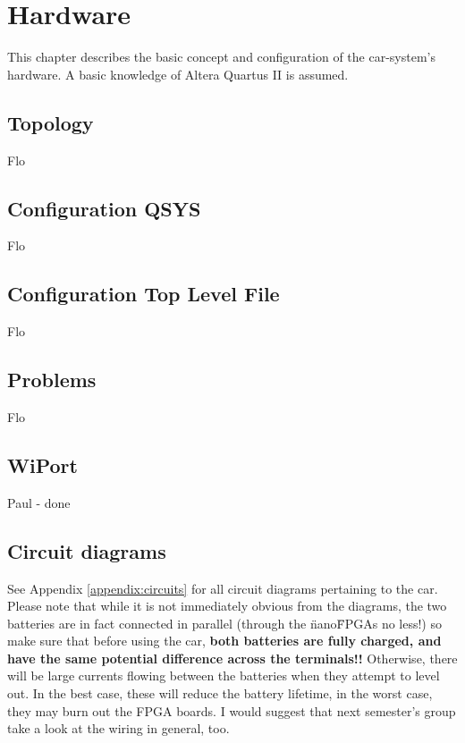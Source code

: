 \chapter{Hardware}
This chapter describes the basic concept and configuration of the car-system's hardware. A basic knowledge of Altera Quartus II is assumed.
\section{Topology}
Flo

\section{Configuration QSYS}
Flo

\section{Configuration Top Level File}
Flo

\section{Problems}
Flo

\section{WiPort}
Paul - done

\section{Circuit diagrams}
See Appendix \ref{appendix:circuits} for all circuit diagrams pertaining to the car. Please note that while it is not immediately obvious from the diagrams, the two batteries are in fact connected in parallel (through the \"nano\" FPGAs no less!) so make sure that before using the car, \textbf{both batteries are fully charged, and have the same potential difference across the terminals!!} Otherwise, there will be large currents flowing between the batteries when they attempt to level out. In the best case, these will reduce the battery lifetime, in the worst case, they may burn out the FPGA boards. I would suggest that next semester's group take a look at the wiring in general, too.
